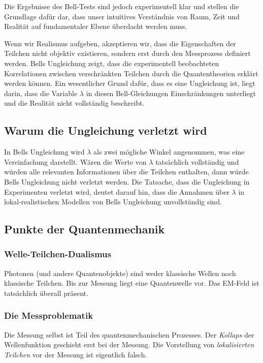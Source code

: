 \documentclass[12pt,a4paper]{article}
\begin{document}
	Die Ergebnisse des Bell-Tests sind jedoch experimentell klar und stellen die Grundlage dafür dar, dass unser intuitives Verständnis von Raum, Zeit und Realität auf fundamentaler Ebene überdacht werden muss.
	
	
	Wenn wir Realismus aufgeben, akzeptieren wir, dass die Eigenschaften der Teilchen nicht objektiv existieren, sondern erst durch den Messprozess definiert werden. Bells Ungleichung zeigt, dass die experimentell beobachteten Korrelationen zwischen verschränkten Teilchen durch die Quantentheorien erklärt werden können. Ein wesentlicher Grund dafür, dass es eine Ungleichung ist, liegt darin, dass die Variable $\lambda$ in diesen Bell-Gleichungen Einschränkungen unterliegt und die Realität nicht vollständig beschreibt.
	
	\subsection{Warum die Ungleichung verletzt wird}
	In Bells Ungleichung wird $\lambda$ als zwei mögliche Winkel angenommen, was eine Vereinfachung darstellt. Wären die Werte von $\lambda$ tatsächlich vollständig und würden alle relevanten Informationen über die Teilchen enthalten, dann würde Bells Ungleichung nicht verletzt werden. Die Tatsache, dass die Ungleichung in Experimenten verletzt wird, deutet darauf hin, dass die Annahmen über $\lambda$ in lokal-realistischen Modellen von Bells Ungleichung unvollständig sind.
	
	\subsection{Punkte der Quantenmechanik}
	\subsubsection{Welle-Teilchen-Dualismus}
	Photonen (und andere Quantenobjekte) sind weder klassische Wellen noch klassische Teilchen. Bis zur Messung liegt eine Quantenwelle vor. Das EM-Feld ist tatsächlich überall präsent.
	
	\subsubsection{Die Messproblematik}
	Die Messung selbst ist Teil des quantenmechanischen Prozesses. Der \textit{Kollaps} der Wellenfunktion geschieht erst bei der Messung. Die Vorstellung von \textit{lokalisierten Teilchen} vor der Messung ist eigentlich falsch.
	
\end{document}
